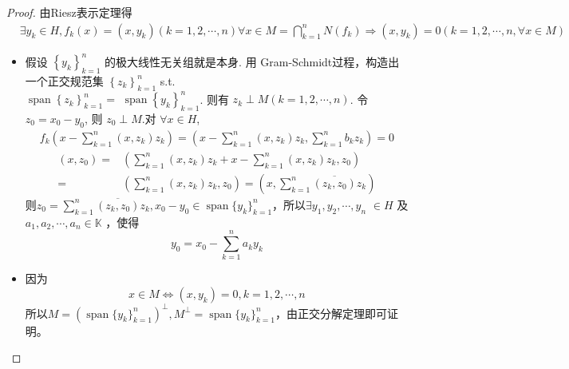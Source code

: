 \documentclass[lang=cn,newtx,10pt,scheme=chinese,thmcnt=chapter]{elegantbook}
\begin{document}
\begin{proof}
由Riesz表示定理得
\begin{equation*}
\begin{aligned}
& \exists y_k \in H, f_k(x)=\left(x, y_k\right)(k=1,2, \cdots, n) \forall x \in M=\bigcap_{k=1}^n N\left(f_k\right) \Rightarrow\left(x, y_k\right)=0(k=1,2, \cdots, n, \forall x \in M)
\end{aligned}
\end{equation*}
\begin{itemize}
    \item 假设 $\left\{y_k\right\}_{k=1}^n$ 的极大线性无关组就是本身. 用 Gram-Schmidt过程，构造出一个正交规范集 $\left\{z_k\right\}_{k=1}^n$ s.t. \\$\operatorname{span}\left\{z_k\right\}_{k=1}^n=$  $\operatorname{span}\left\{y_k\right\}_{k=1}^n$. 则有 $z_k \perp M(k=1,2, \cdots, n)$. 令 $z_0=x_0-y_0$, 则 $z_0 \perp M$.对 $\forall x \in H$,
\begin{equation*}
    \begin{aligned}
        f_k(x-\sum_{k=1}^n\left(x, z_k\right) z_k)=\left(x-\sum_{k=1}^n\left(x, z_k\right) z_k,\sum_{k=1}^n b_k z_k
        \right)=0
    \end{aligned}
\end{equation*}
\begin{equation*}
    \begin{aligned}
 \left(x, z_0\right)=& \left(\sum_{k=1}^n\left(x, z_k\right) z_k+{x-\sum_{k=1}^n\left(x, z_k\right) z_k}, z_0\right)\\
=&\left(\sum_{k=1}^n\left(x, z_k\right) z_k, z_0\right)=\left(x, \sum_{k=1}^n \overline{\left(z_k, z_0\right)} z_k\right) 
    \end{aligned}
\end{equation*}
则$z_0= \sum\limits_{k=1}^n\overline{\left(z_k, z_0\right)} z_k,x_0-y_0\in \operatorname{span}\{y_k\}_{k=1}^n$，所以$\exists y_1, y_2, \cdots, y_n$ $\in H$ 及 $a_1, a_2, \cdots, a_n \in \mathbb{K}$ ，使得
\begin{equation*}
y_0=x_0-\sum_{k=1}^n a_k y_k
\end{equation*}
\item 因为
\[
x\in M\Longleftrightarrow (x,y_k)=0,k=1,2,\cdots,n\]
所以$M=(\operatorname{span}\{y_k\}_{k=1}^n)^\perp,M^\perp =\operatorname{span}\{y_k\}_{k=1}^n$，由正交分解定理即可证明。
\end{itemize}

\end{proof}
\end{document}
